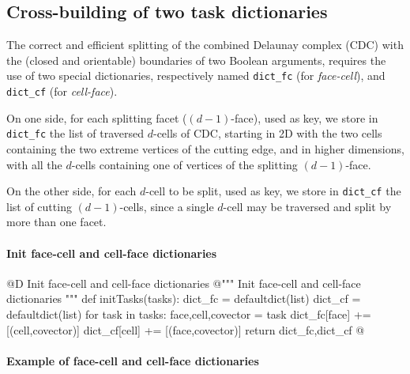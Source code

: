 \documentclass[11pt,oneside]{article}	%
\begin{document}
\subsection{Cross-building of two task dictionaries}

The correct and efficient splitting of the combined Delaunay complex (CDC) with the  (closed and orientable) boundaries of two Boolean arguments, requires the use of two special dictionaries, respectively named \texttt{dict\_fc} (for \emph{face-cell}), and \texttt{dict\_cf} (for \emph{cell-face}).
 
On one side, for each splitting facet ($(d-1)$-face), used as key, we store in \texttt{dict\_fc} the list of traversed $d$-cells of CDC, starting in 2D with the two cells containing the two extreme vertices of the cutting edge, and in higher dimensions, with all the $d$-cells containing one of vertices of the splitting $(d-1)$-face.

On the other side, for each $d$-cell to be split, used as key, we store in \texttt{dict\_cf} the list of cutting $(d-1)$-cells, since a single $d$-cell may be traversed and split by more than one facet. 


\paragraph{Init face-cell and cell-face dictionaries}

@D Init face-cell and cell-face dictionaries
@{""" Init face-cell and cell-face dictionaries """
def initTasks(tasks):
	dict_fc = defaultdict(list)
	dict_cf = defaultdict(list)
	for task in tasks:
		face,cell,covector = task
		dict_fc[face] += [(cell,covector)] 
		dict_cf[cell] += [(face,covector)] 
	return dict_fc,dict_cf
@}

\paragraph{Example of face-cell and cell-face dictionaries}
\end{document}
